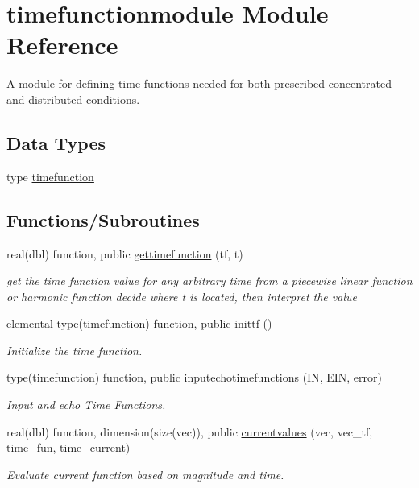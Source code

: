 \hypertarget{namespacetimefunctionmodule}{}\section{timefunctionmodule Module Reference}
\label{namespacetimefunctionmodule}


A module for defining time functions needed for both prescribed concentrated and distributed conditions.  


\subsection*{Data Types}
\begin{DoxyCompactItemize}
\item 
type \hyperlink{structtimefunctionmodule_1_1timefunction}{timefunction}
\end{DoxyCompactItemize}
\subsection*{Functions/\+Subroutines}
\begin{DoxyCompactItemize}
\item 
real(dbl) function, public \hyperlink{namespacetimefunctionmodule_a177d2096c59b79cbbfd85b4e05b57f29}{gettimefunction} (tf, t)
\begin{DoxyCompactList}\small\item\em get the time function value for any arbitrary time from a piecewise linear function or harmonic function decide where t is located, then interpret the value \end{DoxyCompactList}\item 
elemental type(\hyperlink{structtimefunctionmodule_1_1timefunction}{timefunction}) function, public \hyperlink{namespacetimefunctionmodule_a4a9a0cfa8fd5fc6dcfd21c0eeed2a027}{inittf} ()
\begin{DoxyCompactList}\small\item\em Initialize the time function. \end{DoxyCompactList}\item 
type(\hyperlink{structtimefunctionmodule_1_1timefunction}{timefunction}) function, public \hyperlink{namespacetimefunctionmodule_a9dc9317deeac617a45cf48f6101f11d2}{inputechotimefunctions} (IN, E\+IN, error)
\begin{DoxyCompactList}\small\item\em Input and echo Time Functions. \end{DoxyCompactList}\item 
real(dbl) function, dimension(size(vec)), public \hyperlink{namespacetimefunctionmodule_a907e0921288aa4f538e605c521686e4a}{currentvalues} (vec, vec\+\_\+tf, time\+\_\+fun, time\+\_\+current)
\begin{DoxyCompactList}\small\item\em Evaluate current function based on magnitude and time. \end{DoxyCompactList}\end{DoxyCompactItemize}


